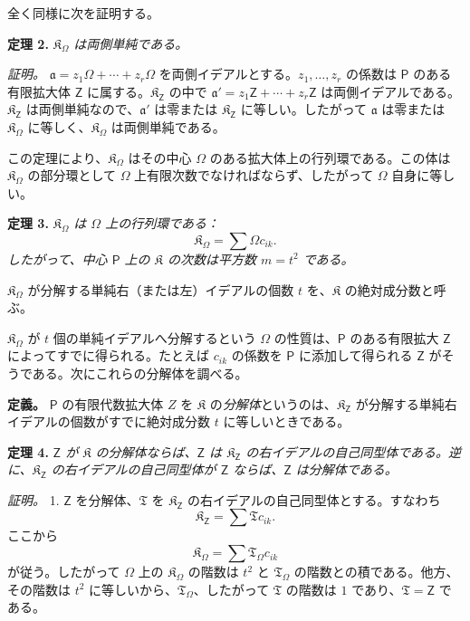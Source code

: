 全く同様に次を証明する。

\textbf{定理 2.} \emph{$\mathfrak K_\Omega$ は両側単純である。}

\emph{証明。} $\mathfrak a=z_1\Omega+\cdots+z_r\Omega$ を両側イデアルとする。$z_1,\ldots,z_r$ の係数は $\mathsf P$ のある有限拡大体 $\mathsf{Z}$ に属する。$\mathfrak K_{\mathsf{Z}}$ の中で $\mathfrak a'=z_1\mathsf{Z}+\cdots+z_r\mathsf{Z}$ は両側イデアルである。$\mathfrak K_{\mathsf{Z}}$ は両側単純なので、$\mathfrak a'$ は零または $\mathfrak K_{\mathsf{Z}}$ に等しい。したがって $\mathfrak a$ は零または $\mathfrak K_\Omega$ に等しく、$\mathfrak K_\Omega$ は両側単純である。

この定理により、$\mathfrak K_\Omega$ はその中心 $\Omega$ のある拡大体上の行列環である。この体は $\mathfrak K_\Omega$ の部分環として $\Omega$ 上有限次数でなければならず、したがって $\Omega$ 自身に等しい。

\textbf{定理 3.} \emph{$\mathfrak K_\Omega$ は $\Omega$ 上の行列環である：}
\[
\mathfrak K_\Omega=\sum\Omega c_{ik}.
\]
\emph{したがって、中心 $\mathsf P$ 上の $\mathfrak K$ の次数は平方数 $m=t^2$ である。}

$\mathfrak K_\Omega$ が分解する単純右（または左）イデアルの個数 $t$ を、$\mathfrak K$ の絶対成分数と呼ぶ。

$\mathfrak K_\Omega$ が $t$ 個の単純イデアルへ分解するという $\Omega$ の性質は、$\mathsf P$ のある有限拡大 $\mathsf{Z}$ によってすでに得られる。たとえば $c_{ik}$ の係数を $\mathsf P$ に添加して得られる $\mathsf{Z}$ がそうである。次にこれらの分解体を調べる。

\textbf{定義。} $\mathsf P$ の有限代数拡大体 $Z$ を $\mathfrak K$ の\emph{分解体}というのは、$\mathfrak K_{\mathsf{Z}}$ が分解する単純右イデアルの個数がすでに絶対成分数 $t$ に等しいときである。

\textbf{定理 4.} \emph{$\mathsf{Z}$ が $\mathfrak K$ の分解体ならば、$\mathsf{Z}$ は $\mathfrak K_{\mathsf{Z}}$ の右イデアルの自己同型体である。逆に、$\mathfrak K_{\mathsf{Z}}$ の右イデアルの自己同型体が $\mathsf{Z}$ ならば、$\mathsf{Z}$ は分解体である。}

\emph{証明。} 1. $\mathsf{Z}$ を分解体、$\mathfrak T$ を $\mathfrak K_{\mathsf{Z}}$ の右イデアルの自己同型体とする。すなわち
\[
\mathfrak K_{\mathsf{Z}}=\sum\mathfrak T c_{ik}.
\]
ここから
\[
\mathfrak K_\Omega=\sum\mathfrak T_\Omega c_{ik}
\]
が従う。したがって $\Omega$ 上の $\mathfrak K_\Omega$ の階数は $t^2$ と $\mathfrak T_\Omega$ の階数との積である。他方、その階数は $t^2$ に等しいから、$\mathfrak T_\Omega$、したがって $\mathfrak T$ の階数は $1$ であり、$\mathfrak T=\mathsf{Z}$ である。

